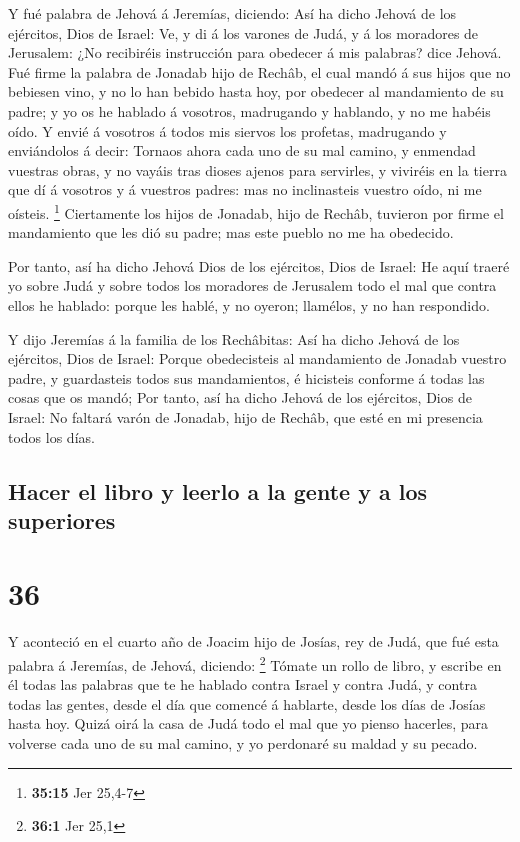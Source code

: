 Y fué palabra de Jehová á Jeremías, diciendo:
 Así ha dicho Jehová de los ejércitos, Dios de Israel:
Ve, y di á los varones de Judá, y á los moradores de Jerusalem: ¿No
recibiréis instrucción para obedecer á mis palabras? dice Jehová.
 Fué firme la palabra de Jonadab hijo de Rechâb, el cual
mandó á sus hijos que no bebiesen vino, y no lo han bebido hasta hoy,
por obedecer al mandamiento de su padre; y yo os he hablado á vosotros,
madrugando y hablando, y no me habéis oído.  Y envié á
vosotros á todos mis siervos los profetas, madrugando y enviándolos á
decir: Tornaos ahora cada uno de su mal camino, y enmendad vuestras
obras, y no vayáis tras dioses ajenos para servirles, y viviréis en la
tierra que dí á vosotros y á vuestros padres: mas no inclinasteis
vuestro oído, ni me oísteis. \footnote{\textbf{35:15} Jer 25,4-7}
 Ciertamente los hijos de Jonadab, hijo de Rechâb,
tuvieron por firme el mandamiento que les dió su padre; mas este pueblo
no me ha obedecido.

 Por tanto, así ha dicho Jehová Dios de los ejércitos,
Dios de Israel: He aquí traeré yo sobre Judá y sobre todos los moradores
de Jerusalem todo el mal que contra ellos he hablado: porque les hablé,
y no oyeron; llamélos, y no han respondido.

 Y dijo Jeremías á la familia de los Rechâbitas: Así ha
dicho Jehová de los ejércitos, Dios de Israel: Porque obedecisteis al
mandamiento de Jonadab vuestro padre, y guardasteis todos sus
mandamientos, é hicisteis conforme á todas las cosas que os mandó;
 Por tanto, así ha dicho Jehová de los ejércitos, Dios de
Israel: No faltará varón de Jonadab, hijo de Rechâb, que esté en mi
presencia todos los días.

\hypertarget{hacer-el-libro-y-leerlo-a-la-gente-y-a-los-superiores}{%
\subsection{Hacer el libro y leerlo a la gente y a los
superiores}\label{hacer-el-libro-y-leerlo-a-la-gente-y-a-los-superiores}}

\hypertarget{section-35}{%
\section{36}\label{section-35}}

 Y aconteció en el cuarto año de Joacim hijo de Josías,
rey de Judá, que fué esta palabra á Jeremías, de Jehová, diciendo:
\footnote{\textbf{36:1} Jer 25,1}  Tómate un rollo de
libro, y escribe en él todas las palabras que te he hablado contra
Israel y contra Judá, y contra todas las gentes, desde el día que
comencé á hablarte, desde los días de Josías hasta hoy. 
Quizá oirá la casa de Judá todo el mal que yo pienso hacerles, para
volverse cada uno de su mal camino, y yo perdonaré su maldad y su
pecado.

